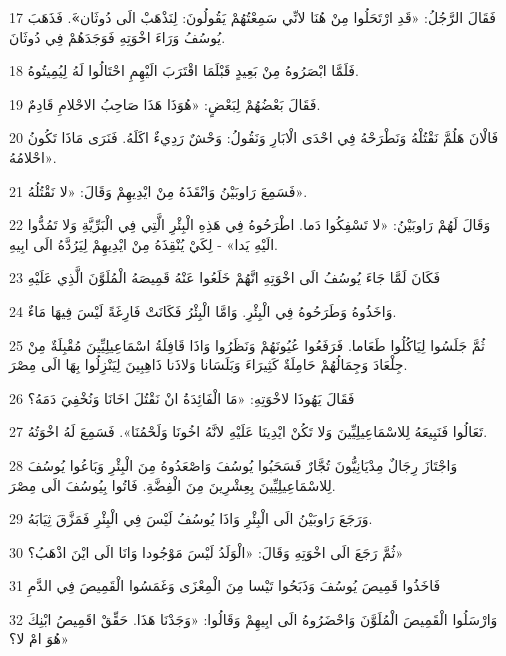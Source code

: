 \par 17 فَقَالَ الرَّجُلُ: «قَدِ ارْتَحَلُوا مِنْ هُنَا لانِّي سَمِعْتُهُمْ يَقُولُونَ: لِنَذْهَبْ الَى دُوثَان»َ. فَذَهَبَ يُوسُفُ وَرَاءَ اخْوَتِهِ فَوَجَدَهُمْ فِي دُوثَانَ.
\par 18 فَلَمَّا ابْصَرُوهُ مِنْ بَعِيدٍ قَبْلَمَا اقْتَرَبَ الَيْهِمِ احْتَالُوا لَهُ لِيُمِيتُوهُ.
\par 19 فَقَالَ بَعْضُهُمْ لِبَعْضٍ: «هُوَذَا هَذَا صَاحِبُ الاحْلامِ قَادِمٌ.
\par 20 فَالْانَ هَلُمَّ نَقْتُلْهُ وَنَطْرَحْهُ فِي احْدَى الْابَارِ وَنَقُولُ: وَحْشٌ رَدِيءٌ اكَلَهُ. فَنَرَى مَاذَا تَكُونُ احْلامُهُ».
\par 21 فَسَمِعَ رَاوبَيْنُ وَانْقَذَهُ مِنْ ايْدِيهِمْ وَقَالَ: «لا نَقْتُلُهُ».
\par 22 وَقَالَ لَهُمْ رَاوبَيْنُ: «لا تَسْفِكُوا دَما. اطْرَحُوهُ فِي هَذِهِ الْبِئْرِ الَّتِي فِي الْبَرِّيَّةِ وَلا تَمُدُّوا الَيْهِ يَدا» - لِكَيْ يُنْقِذَهُ مِنْ ايْدِيهِمْ لِيَرُدَّهُ الَى ابِيهِ.
\par 23 فَكَانَ لَمَّا جَاءَ يُوسُفُ الَى اخْوَتِهِ انَّهُمْ خَلَعُوا عَنْهُ قَمِيصَهُ الْمُلَوَّنَ الَّذِي عَلَيْهِ
\par 24 وَاخَذُوهُ وَطَرَحُوهُ فِي الْبِئْرِ. وَامَّا الْبِئْرُ فَكَانَتْ فَارِغَةً لَيْسَ فِيهَا مَاءٌ.
\par 25 ثُمَّ جَلَسُوا لِيَاكُلُوا طَعَاما. فَرَفَعُوا عُيُونَهُمْ وَنَظَرُوا وَاذَا قَافِلَةُ اسْمَاعِيلِيِّينَ مُقْبِلَةٌ مِنْ جِلْعَادَ وَجِمَالُهُمْ حَامِلَةٌ كَثِيرَاءَ وَبَلَسَانا وَلاذَنا ذَاهِبِينَ لِيَنْزِلُوا بِهَا الَى مِصْرَ.
\par 26 فَقَالَ يَهُوذَا لاخْوَتِهِ: «مَا الْفَائِدَةُ انْ نَقْتُلَ اخَانَا وَنُخْفِيَ دَمَهُ؟
\par 27 تَعَالُوا فَنَبِيعَهُ لِلاسْمَاعِيلِيِّينَ وَلا تَكُنْ ايْدِينَا عَلَيْهِ لانَّهُ اخُونَا وَلَحْمُنَا». فَسَمِعَ لَهُ اخْوَتُهُ.
\par 28 وَاجْتَازَ رِجَالٌ مِدْيَانِيُّونَ تُجَّارٌ فَسَحَبُوا يُوسُفَ وَاصْعَدُوهُ مِنَ الْبِئْرِ وَبَاعُوا يُوسُفَ لِلاسْمَاعِيلِيِّينَ بِعِشْرِينَ مِنَ الْفِضَّةِ. فَاتُوا بِيُوسُفَ الَى مِصْرَ.
\par 29 وَرَجَعَ رَاوبَيْنُ الَى الْبِئْرِ وَاذَا يُوسُفُ لَيْسَ فِي الْبِئْرِ فَمَزَّقَ ثِيَابَهُ.
\par 30 ثُمَّ رَجَعَ الَى اخْوَتِهِ وَقَالَ: «الْوَلَدُ لَيْسَ مَوْجُودا وَانَا الَى ايْنَ اذْهَبُ؟»
\par 31 فَاخَذُوا قَمِيصَ يُوسُفَ وَذَبَحُوا تَيْسا مِنَ الْمِعْزَى وَغَمَسُوا الْقَمِيصَ فِي الدَّمِ
\par 32 وَارْسَلُوا الْقَمِيصَ الْمُلَوَّنَ وَاحْضَرُوهُ الَى ابِيهِمْ وَقَالُوا: «وَجَدْنَا هَذَا. حَقِّقْ اقَمِيصُ ابْنِكَ هُوَ امْ لا؟»
